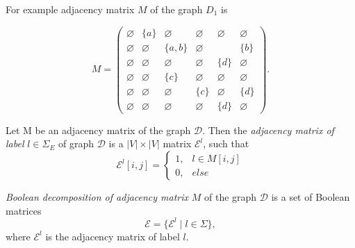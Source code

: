 For example adjacency matrix $M$ of the graph $D_1$ is

$$
    M =
    \begin{pmatrix}
    \varnothing     & \{a\} &   \varnothing      &   \varnothing   &   \varnothing   &   \varnothing   \\
    \varnothing     &   \varnothing   & \{a, b\} &   \varnothing   &       & \{b\} \\
    \varnothing     &   \varnothing   &   \varnothing      &   \varnothing   & \{d\} &   \varnothing   \\
    \varnothing     &   \varnothing   & \{c\}    &   \varnothing   &   \varnothing   &   \varnothing   \\
    \varnothing     &   \varnothing   &   \varnothing      & \{c\} &   \varnothing   & \{d\} \\
    \varnothing     & \varnothing     &   \varnothing      &   \varnothing   & \{d\} &   \varnothing
    \end{pmatrix}.
$$

\begin{definition}
Let M be an adjacency matrix of the graph $\mathcal{D}$. Then the \emph{adjacency matrix of label} $l \in \Sigma_E$ of graph $\mathcal{D}$ is a $|V| \times |V|$ matrix $\mathcal{E}^l$, such that
\begin{equation*}
\mathcal{E}^l[i,j] =
 \begin{cases}
   1, & l \in M[i,j]\\
   0, & else
 \end{cases}
\end{equation*}
\end{definition}

\begin{definition}
\emph{Boolean decomposition of adjacency matrix} $M$ of the graph $\mathcal{D}$ is a set of Boolean matrices $$\mathcal{E} = \{\mathcal{E}^l \mid l \in \Sigma\},$$
where $\mathcal{E}^l$ is the adjacency matrix of label $l$.
\end{definition}

